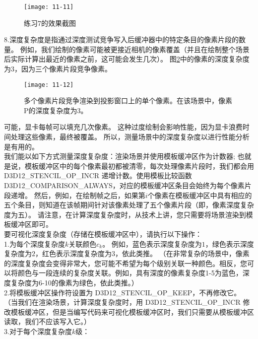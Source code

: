 \begin{figure}[h]
    \texttt{[image: 11-11]}
    \centering
    \caption{练习7的效果截图}
    \label{fig:11-11}
\end{figure}

\begin{flushleft}
8.深度复杂度是指通过深度测试竞争写入后缓冲器中的特定条目的像素片段的数量。 例如，我们绘制的像素可能被更接近相机的像素覆盖（并且在绘制整个场景后实际计算出最近的像素之前，这可能会发生几次）。 图\ref{fig:11-12}中的像素的深度复杂度为3，因为三个像素片段竞争像素。
\end{flushleft}

\begin{figure}[h]
    \texttt{[image: 11-12]}
    \centering
    \caption{多个像素片段竞争渲染到投影窗口上的单个像素。在该场景中，像素P的深度复杂度为3。}
    \label{fig:11-12}
\end{figure}

\begin{flushleft}
可能，显卡每帧可以填充几次像素。 这种过度绘制会影响性能，因为显卡浪费时间处理这些像素，最终被覆盖。 所以，测量场景中的深度复杂度以进行性能分析是有用的。\\

我们能以如下方式测量深度复杂度：渲染场景并使用模板缓冲区作为计数器; 也就是说，模板缓冲区中的每个像素最初都被清零，每次处理像素片段时，我们都会用 D3D12\_STENCIL\_OP\_INCR 递增计数。使用模板比较函数 D3D12\_COMPARISON\_ALWAYS，对应的模板缓冲区条目会始终为每个像素片段递增。 然后，例如，在绘制帧之后，如果第$i$个像素在模板缓冲区中具有相应的五个条目，则知道在该帧期间针对该像素处理了五个像素片段（即，像素深度复杂度为五）。 请注意，在计算深度复杂度时，从技术上讲，您只需要将场景渲染到模板缓冲区即可。\\

要可视化深度复杂度（存储在模板缓冲区中），请执行以下操作：\\

1.为每个深度复杂度$k$关联颜色$c_{k}$。 例如，蓝色表示深度复杂度为$1$，绿色表示深度复杂度为$2$，红色表示深度复杂度为$3$，依此类推。 （在非常复杂的场景中，像素的深度复杂度会变得非常大，您可能不希望为每个级别关联一种颜色。相反，您可以将颜色与一段连续的复杂度关联。例如，具有深度的像素复杂度1-5为蓝色，深度复杂度为6-10的像素为绿色，依此类推。）\\

2.将模板缓冲区操作符设置为 D3D12\_STENCIL\_OP\_KEEP，不再修改它。 （当我们在渲染场景，计算深度复杂度时，用 D3D12\_STENCIL\_OP\_INCR 修改模板缓冲区，但是当编写代码来可视化模板缓冲区时，我们只需要从模板缓冲区读取，我们不应该写入它。）\\

3.对于每个深度复杂度$k$级：\\
\end{flushleft}

